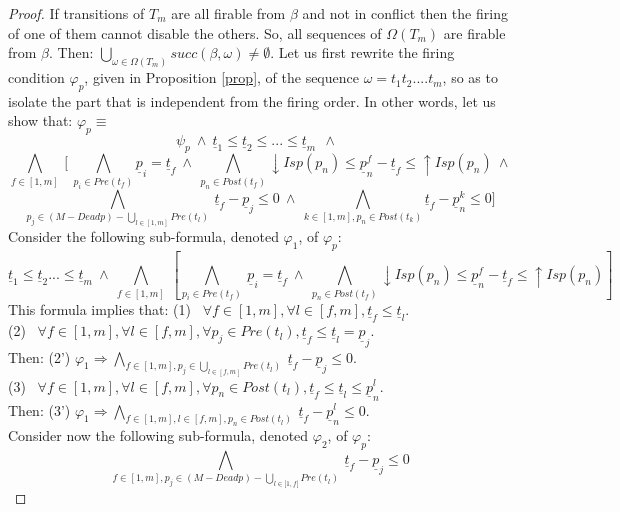 \documentclass[submission,copyright,creativecommons]{eptcs}
\newtheorem{proof}{Proof}
\numberwithin{equation}{section}
\begin{document}
 \begin{proof} If transitions of $T_m$ are all firable from $\beta$ and not in conflict then the firing of one of them cannot disable the others. So, all sequences of $\Omega(T_m)$ are firable from $\beta$. Then: $\underset{\omega \in \Omega(T_m)} \bigcup succ(\beta, \omega) \neq \emptyset$.
Let us first rewrite the firing condition $\varphi_p$, given in Proposition \ref{prop}, of the sequence $\omega= t_1t_2....t_m$, so as to isolate the part that is independent from the firing order. In other words, let us show that:
$\varphi_p \equiv$ $$\psi_p \ \wedge \ \underline{t}_1 \leq \underline{t}_2 \leq ... \leq \underline{t}_m \ \ \wedge \ \ $$ $$ \underset{f \in [1,m]} \bigwedge \ [ \ \underset{p_i \in Pre(t_{f})} \bigwedge  \underline{p}_i = \underline{t}_f \ \wedge \ \underset{p_n \in Post(t_{f})} \bigwedge {\downarrow Isp(p_{n})} \leq \underline{p}_{n}^f - \underline{t}_{f} \leq
{\uparrow Isp(p_{n})} \ \wedge $$   $$ \underset{p_j \in (M-Deadp) - \underset{l \in [1,m]} \bigcup Pre(t_{l})} \bigwedge   \  \underline{t}_{f} - \underline{p}_{j} \leq 0  \  \wedge  \  \underset{ k \in[1,m], p_n \in Post(t_{k})} \bigwedge \underline{t}_{f} - \underline{p}_{n}^k \leq 0 ]$$
Consider the following sub-formula, denoted $\varphi_1$, of $\varphi_p$: $$ \underline{t}_1 \leq \underline{t}_2 ... \leq \underline{t}_m  \ \wedge \ \underset{f \in [1,m]} \bigwedge \ [  \underset{p_i \in Pre(t_{f})} \bigwedge \  \underline{p}_i = \underline{t}_f \ \wedge \ \underset{p_n \in Post(t_{f})} \bigwedge {\downarrow Isp(p_{n})} \leq \underline{p}_{n}^f - \underline{t}_{f} \leq
{\uparrow Isp(p_{n})}]$$
This formula implies that:
(1) \ $\forall f \in [1,m], \forall l \in [f,m], \underline{t}_f \leq \underline{t}_l$. \\
(2) \ $\forall f \in [1,m],\forall l \in [f,m], \forall p_j \in Pre(t_l), \underline{t}_f \leq \underline{t}_l = \underline{p}_j$.\\ Then: (2') $\varphi_1 \Rightarrow \underset{f \in [1,m], p_j \in \underset{l \in [f,m]} \bigcup Pre(t_{l})} \bigwedge   \  \underline{t}_{f} - \underline{p}_{j} \leq 0$.\\
(3) \ $\forall f \in [1,m],\forall l \in [f,m], \forall p_n \in Post(t_l), \underline{t}_f \leq \underline{t}_l \leq \underline{p}_n^l$.\\ Then: (3') $\varphi_1 \Rightarrow \underset{f \in [1,m], l \in [f,m], p_n \in Post(t_{l})} \bigwedge   \  \underline{t}_{f} - \underline{p}_{n}^l \leq 0$.\\
Consider now the following sub-formula, denoted $\varphi_2$, of $\varphi_p$: $$\underset{f \in [1,m], p_j \in (M-Deadp) - \underset{l \in [1,f[} \bigcup Pre(t_{l})} \bigwedge   \  \underline{t}_{f} - \underline{p}_{j} \leq 0$$

\end{proof}
\end{document}
